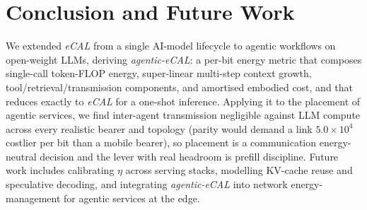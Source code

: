\documentclass[journal]{IEEEtran}
\newif\ifshowchanges \showchangestrue
\newcommand{\NEW}{\ifshowchanges\color{blue}\fi}
\newcommand{\OLD}{\ifshowchanges\color{black}\fi}
\newcommand{\parityFactor}{\ensuremath{5.0\times10^{4}}}%
\newcommand{\agecal}{\textit{agentic-eCAL}}
\newcommand{\ecal}{\textit{eCAL}}
\begin{document}
\section{Conclusion and Future Work}\label{sec:conclusion}
We extended \ecal{} from a single AI-model lifecycle to agentic workflows on open-weight LLMs,
deriving \agecal{}: a per-bit energy metric that composes single-call token-FLOP energy, super-linear
multi-step context growth, tool/retrieval/transmission components, and amortised embodied cost, and
that reduces exactly to \ecal{} for a one-shot inference. \NEW Applying it to the placement of
agentic services, we find inter-agent transmission negligible against LLM compute across every
realistic bearer and topology (parity would demand a link \parityFactor{} costlier per bit than a
mobile bearer), so placement is a communication energy-neutral decision and the lever with real headroom is
prefill discipline.\OLD{} Future work includes calibrating $\eta$
across serving stacks, modelling KV-cache reuse and speculative decoding, and integrating \agecal{}
into network energy-management for agentic services at the edge.



\end{document}
